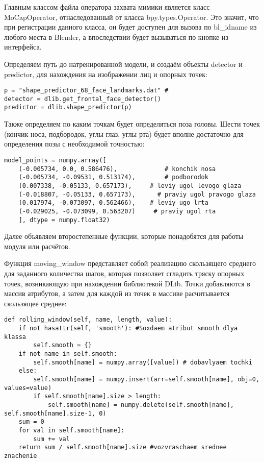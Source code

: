 
Главным классом файла оператора захвата мимики является класс MoCapOperator, отнаследованный от класса bpy.types.Operator. Это значит, что при регистрации данного класса, он будет доступен для вызова по bl\_idname из любого места в Blender, а впоследствии будет вызываться по кнопке из интерфейса.

Определяем путь до натренированной модели, и создаём объекты detector и predictor, для нахождения на изображении лиц и опорных точек:
\begin{lstlisting}
p = "shape_predictor_68_face_landmarks.dat" #
detector = dlib.get_frontal_face_detector()
predictor = dlib.shape_predictor(p)
\end{lstlisting}

Также определяем по каким точкам будет определяться поза головы. Шести точек (кончик носа, подбородок, углы глаз, углы рта) будет вполне достаточно для определения позы с необходимой точностью:
\begin{lstlisting}
model_points = numpy.array([
	(-0.005734, 0.0, 0.586476),             # konchik nosa
	(-0.005734, -0.09531, 0.513174),        # podborodok
	(0.007338, -0.05133, 0.657173),     # leviy ugol levogo glaza
	(-0.018807, -0.05133, 0.657173),      # praviy ugol pravogo glaza
	(0.017974, -0.073097, 0.562466),    # leviy ugo lrta
	(-0.029025, -0.073099, 0.563207)     # praviy ugol rta
	], dtype = numpy.float32)
\end{lstlisting}

Далее объявляем второстепенные функции, которые понадобятся для работы модуля или расчётов.

Функция moving\_window представляет собой реализацию скользящего среднего для заданного количества шагов, которая позволяет сгладить тряску опорных точек, возникающую при нахождении библиотекой DLib. Точки добавляются в массив атрибутов, а затем для каждой из точек в массиве расчитывается скользящее среднее:
\begin{lstlisting}
def rolling_window(self, name, length, value):
	if not hasattr(self, 'smooth'): #Soxdaem atribut smooth dlya klassa
		self.smooth = {}
	if not name in self.smooth:
		self.smooth[name] = numpy.array([value]) # dobavlyaem tochki
	else:
		self.smooth[name] = numpy.insert(arr=self.smooth[name], obj=0, values=value)
		if self.smooth[name].size > length:
			self.smooth[name] = numpy.delete(self.smooth[name], self.smooth[name].size-1, 0)
	sum = 0
	for val in self.smooth[name]:
		sum += val
	return sum / self.smooth[name].size #vozvraschaem srednee znachenie 
\end{lstlisting}

